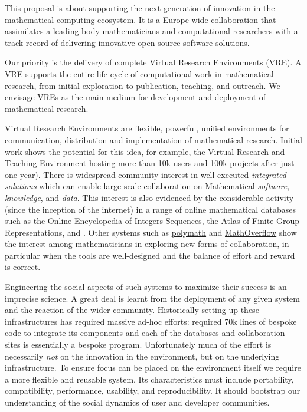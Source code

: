 This proposal is about supporting the next generation of innovation in the mathematical computing ecosystem. It is a Europe-wide collaboration that assimilates a leading body mathematicians and computational researchers with a track record of delivering innovative open source software solutions.

\begin{center}
  \begin{boxedminipage}{.95\textwidth}\em

    Our priority is the delivery of complete Virtual Research
    Environments (VRE). A VRE supports the entire life-cycle of
    computational work in mathematical research, from initial
    exploration to publication, teaching, and outreach. We envisage
    VREs as the main medium for development and deployment of
    mathematical research.
  \end{boxedminipage}
\end{center}


Virtual Research Environments are flexible, powerful, unified
environments for communication, distribution and implementation of
mathematical research. Initial work shows the potential for this idea,
for example, the Virtual Research and Teaching Environment \SMC
hosting more than 10k users and 100k projects after just one
year). There is widespread community interest in well-executed
\emph{integrated solutions} which can enable large-scale collaboration
on Mathematical \emph{software}, \emph{knowledge}, and
\emph{data}. This interest is also evidenced by the considerable
activity (since the inception of the internet) in a range of online
mathematical databases such as the Online Encyclopedia of Integers
Sequences, the Atlas of Finite Group Representations, and \LMFDB. 
%
Other systems such as \href{http://polymathprojects.org/}{polymath}
and \href{mathoverflow.net}{MathOverflow} show the interest among
mathematicians in exploring new forms of collaboration, in particular
when the tools are well-designed and the balance of effort and reward
is correct.


Engineering the social aspects of such systems to maximize their
success is an imprecise science. A great deal is learnt from the
deployment of any given system and the reaction of the wider
community. Historically setting up these infrastructures has required
massive ad-hoc efforts: \SMC required 70k lines of
bespoke code to integrate its components and each of
the databases and collaboration sites is essentially a bespoke
program. Unfortunately much of the effort is necessarily \emph{not} on
the innovation in the environment, but on the underlying
infrastructure. To ensure focus can be placed on the environment
itself we require a more flexible and reusable system. Its
characteristics must include portability, compatibility, performance,
usability, and reproducibility. It should bootstrap our understanding
of the social dynamics of user and developer communities.

